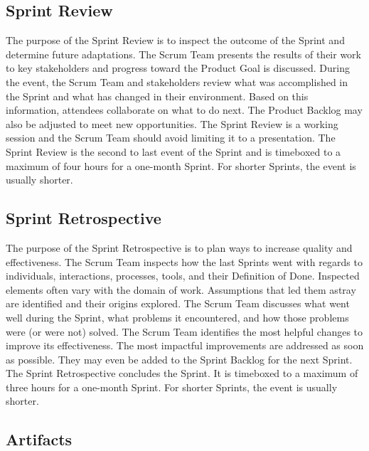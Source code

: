 \subsection{Sprint Review}\label{scrum-sprint-review}

\begin{flushleft}
	The purpose of the Sprint Review is to inspect the outcome of the Sprint and determine
	future adaptations. The Scrum Team presents the results of their work to key stakeholders
	and progress toward the Product Goal is discussed. During the event, the Scrum Team and
	stakeholders review what was accomplished in the Sprint and what has changed in their
	environment. Based on this information, attendees collaborate on what to do next. The
	Product Backlog may also be adjusted to meet new opportunities. The Sprint Review is
	a working session and the Scrum Team should avoid limiting it to a presentation. The
	Sprint Review is the second to last event of the Sprint and is timeboxed to a maximum
	of four hours for a one-month Sprint. For shorter Sprints, the event is usually shorter.
\end{flushleft}

\subsection{Sprint Retrospective}\label{scrum-sprint-retrospective}

\begin{flushleft}
	The purpose of the Sprint Retrospective is to plan ways to increase quality and
	effectiveness. The Scrum Team inspects how the last Sprints went with
	regards to individuals, interactions, processes, tools, and their Definition
	of Done. Inspected elements often vary with the domain of work. Assumptions
	that led them astray are identified and their origins explored. The Scrum Team
	discusses what went well during the Sprint, what problems it encountered, and
	how those problems were (or were not) solved. The Scrum Team identifies the most
	helpful changes to improve its effectiveness. The most impactful improvements are
	addressed as soon as possible. They may even be added to the Sprint Backlog for
	the next Sprint. The Sprint Retrospective concludes the Sprint. It is timeboxed
	to a maximum of three hours for a one-month Sprint. For shorter Sprints, the event
	is usually shorter.
\end{flushleft}

\subsection{Artifacts}\label{scrum-artifacts}


